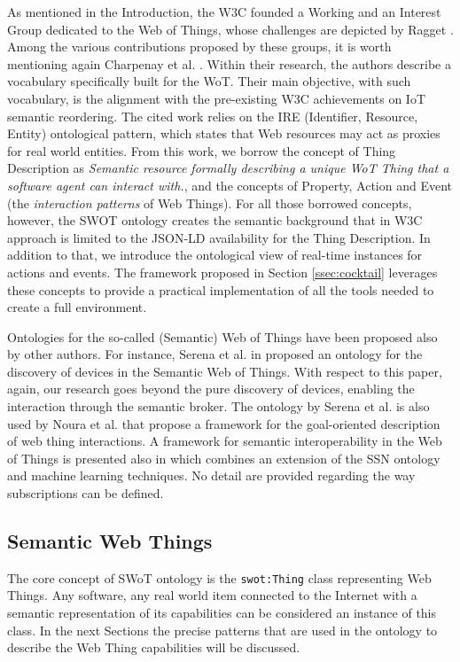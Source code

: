 As mentioned in the Introduction, the W3C founded a Working and an Interest Group dedicated to the Web of Things, whose challenges are depicted by Ragget \cite{raggett2015web}. Among the various contributions proposed by these groups, it is worth mentioning again Charpenay et al. \cite{charpenay2016introducing}. Within their research, the authors describe a vocabulary specifically built for the WoT. Their main objective, with such vocabulary, is the alignment with the pre-existing W3C achievements on IoT semantic reordering. The cited work relies on the IRE (Identifier, Resource, Entity) ontological pattern, which states that Web resources may act as proxies for real world entities. From this work, we borrow the concept of Thing Description as \textit{Semantic resource formally describing a unique WoT Thing that a software agent can interact with.}, and the concepts of Property, Action and Event (the \textit{interaction patterns} of Web Things). For all those borrowed concepts, however, the SWOT ontology creates the semantic background that in W3C approach is limited to the JSON-LD availability for the Thing Description. In addition to that, we introduce the ontological view of real-time instances for actions and events. The framework proposed in Section \ref{ssec:cocktail} leverages these concepts to provide a practical implementation of all the tools needed to create a full environment.

Ontologies for the so-called (Semantic) Web of Things have been proposed also by other authors. For instance, Serena et al. in \cite{serena2018discovery} proposed an ontology for the discovery of devices in the Semantic Web of Things. With respect to this paper, again, our research goes beyond the pure discovery of devices, enabling the interaction through the semantic broker. The ontology by Serena et al. is also used by Noura et al. \cite{noura2018growth} that propose a framework for the goal-oriented description of web thing interactions. A framework for semantic interoperability in the Web of Things is presented also in \cite{wu2017towards} which combines an extension of the SSN ontology and machine learning techniques. No detail are provided regarding the way subscriptions can be defined.

\subsection{Semantic Web Things}
\label{ssec:semantic_web_things}
The core concept of SWoT ontology is the \texttt{swot:Thing} class representing Web Things. Any software, any real world item connected to the Internet with a semantic representation of its capabilities can be considered an instance of this class. In the next Sections the precise patterns that are used in the ontology to describe the Web Thing capabilities will be discussed.

